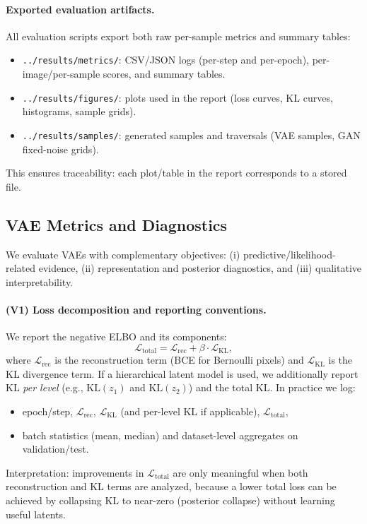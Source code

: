 \paragraph{Exported evaluation artifacts.}
All evaluation scripts export both raw per-sample metrics and summary tables:
\begin{itemize}
  \item \texttt{../results/metrics/}: CSV/JSON logs (per-step and per-epoch), per-image/per-sample scores, and summary tables.
  \item \texttt{../results/figures/}: plots used in the report (loss curves, KL curves, histograms, sample grids).
  \item \texttt{../results/samples/}: generated samples and traversals (VAE samples, GAN fixed-noise grids).
\end{itemize}
This ensures traceability: each plot/table in the report corresponds to a stored file.

\subsection{VAE Metrics and Diagnostics}
We evaluate VAEs with complementary objectives: (i) predictive/likelihood-related evidence, (ii) representation and posterior diagnostics, and (iii) qualitative interpretability.

\paragraph{(V1) Loss decomposition and reporting conventions.}
We report the negative ELBO and its components:
\[
\mathcal{L}_{\mathrm{total}} = \mathcal{L}_{\mathrm{rec}} + \beta \cdot \mathcal{L}_{\mathrm{KL}},
\]
where $\mathcal{L}_{\mathrm{rec}}$ is the reconstruction term (BCE for Bernoulli pixels) and $\mathcal{L}_{\mathrm{KL}}$ is the KL divergence term. If a hierarchical latent model is used, we additionally report KL \emph{per level} (e.g., $\mathrm{KL}(z_1)$ and $\mathrm{KL}(z_2)$) and the total KL. In practice we log:
\begin{itemize}
  \item epoch/step, $\mathcal{L}_{\mathrm{rec}}$, $\mathcal{L}_{\mathrm{KL}}$ (and per-level KL if applicable), $\mathcal{L}_{\mathrm{total}}$,
  \item batch statistics (mean, median) and dataset-level aggregates on validation/test.
\end{itemize}
Interpretation: improvements in $\mathcal{L}_{\mathrm{total}}$ are only meaningful when both reconstruction and KL terms are analyzed, because a lower total loss can be achieved by collapsing KL to near-zero (posterior collapse) without learning useful latents.

